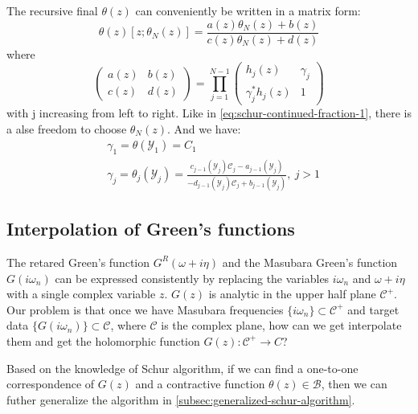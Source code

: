\documentclass[
	preprint,%
	aps,
	prb,
	showpacs,	
	amsmath, amssymb]{revtex4-2}
\newcommand{\Y}{ {\mathcal{Y}} }
\newcommand{\C}{ {\mathcal{C}} }
\newcommand{\B}{ {\mathcal{B}} }
\begin{document}
The recursive final $\theta(z)$ can conveniently be written in a
matrix form:
\begin{equation}\label{eq:recursive-theta}
	\theta(z)[z;\theta_N(z)] 
		= \frac{a(z)\theta_N(z) + b(z)}{c(z)\theta_N(z) + d(z)}
\end{equation}
where
\begin{equation}\label{eq:factor-matrix}
	\left(
		\begin{matrix}
			a(z) & b(z) \\
			c(z) & d(z)
		\end{matrix}
	\right) = \prod_{j=1}^{N-1}
	\left(
		\begin{matrix}
			h_j(z)            & \gamma_j \\
			\gamma_j^* h_j(z) & 1
		\end{matrix}
	\right)
\end{equation}
with j increasing from left to right. Like in \cref{eq:schur-continued-fraction-1}, 
there is a alse freedom to choose $\theta_N(z)$. And we have:
\begin{align}
	\label{eq:schur-parameter-1}
	&\gamma_1 = \theta(\Y_1) = C_1 \\
	\label{eq:schur-parameter-2}
	&\gamma_j = \theta_j(\Y_j)
	= \frac{c_{j-1}(\Y_j) \C_j - a_{j-1}(\Y_j)}
	{-d_{j-1}(\Y_j) \C_j + b_{j-1}(\Y_j)}, \ j>1
\end{align}


\subsection{Interpolation of Green's functions}
\label{subsec:interpolation-of-GF}

The retared Green's function $G^R(\omega + i\eta)$ and the Masubara 
Green's function $G(i\omega_n)$ can be expressed consistently by replacing 
the variables $i\omega_n$ and $\omega + i\eta$ with a single complex 
variable $z$. $G(z)$ is analytic in the upper half plane $\C^+$. 
Our problem is that once we have Masubara frequencies 
$\{i\omega_n\} \subset \C^+$ 
and target data $\{ G(i\omega_n)\} \subset  \C$, where $\C$ is 
the complex plane, how can we get interpolate them and get the 
holomorphic function $G(z):\C^+ \to C$?

Based on the knowledge of Schur algorithm, if we can find 
a one-to-one correspondence of $G(z)$ and a contractive 
function $\theta(z) \in \B$, then we can futher generalize 
the algorithm in \cref{subsec:generalized-schur-algorithm}.
\end{document}
